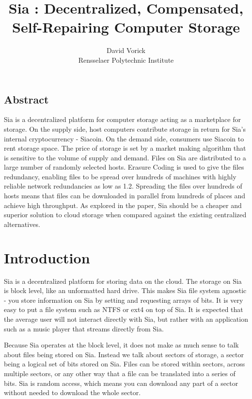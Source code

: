 \documentclass[twocolumn]{article}
\begin{document}
\frenchspacing

\title{Sia : Decentralized, Compensated, Self-Repairing Computer Storage}

\author{
{\rm David Vorick}\\
Rensselaer Polytechnic Institute
}

\maketitle

\subsection*{Abstract}
Sia is a decentralized platform for computer storage acting as a marketplace for storage.
On the supply side, host computers contribute storage in return for Sia's internal cryptocurrency - Siacoin.
On the demand side, consumers use Siacoin to rent storage space.
The price of storage is set by a market making algorithm that is sensitive to the volume of supply and demand.
Files on Sia are distributed to a large number of randomly selected hosts.
Erasure Coding is used to give the files redundancy, enabling files to be spread over hundreds of machines with highly reliable network redundancies as low as 1.2.
Spreading the files over hundreds of hosts means that files can be downloaded in parallel from hundreds of places and achieve high throughput.
As explored in the paper, Sia should be a cheaper and superior solution to cloud storage when compared against the existing centralized alternatives.

\section{Introduction}

Sia is a decentralized platform for storing data on the cloud.
The storage on Sia is block level, like an unformatted hard drive.
This makes Sia file system agnostic - you store information on Sia by setting and requesting arrays of bits.
It is very easy to put a file system such as NTFS or ext4 on top of Sia.
It is expected that the average user will not interact directly with Sia, but rather with an application such as a music player that streams directly from Sia.

Because Sia operates at the block level, it does not make as much sense to talk about files being stored on Sia.
Instead we talk about sectors of storage, a sector being a logical set of bits stored on Sia.
Files can be stored within sectors, across multiple sectors, or any other way that a file can be translated into a series of bits.
Sia is random access, which means you can download any part of a sector without needed to download the whole sector.
\end{document}
